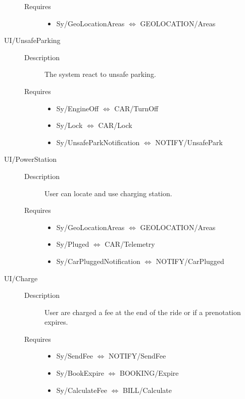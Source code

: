 \documentclass[11pt]{article} %
\begin{document}
\begin{description}
\begin{description}
		\item[Requires] \hfill
		\begin{itemize}
			\item Sy/GeoLocationAreas $\Leftrightarrow$ GEOLOCATION/Areas
		\end{itemize}
	\end{description}
	\item[UI/UnsafeParking] \hfill
	\begin{description}
		\item[Description] The system react to unsafe parking.
		\item[Requires] \hfill
		\begin{itemize}
			\item Sy/EngineOff $\Leftrightarrow$ CAR/TurnOff
			\item Sy/Lock $\Leftrightarrow$ CAR/Lock
			\item Sy/UnsafeParkNotification $\Leftrightarrow$  NOTIFY/UnsafePark
		\end{itemize}
	\end{description}
	\item[UI/PowerStation] \hfill
	\begin{description}
		\item[Description] User can locate and use charging station.
		\item[Requires] \hfill
		\begin{itemize}
			\item Sy/GeoLocationAreas $\Leftrightarrow$ GEOLOCATION/Areas
			\item Sy/Pluged $\Leftrightarrow$ CAR/Telemetry
			\item Sy/CarPluggedNotification $\Leftrightarrow$ NOTIFY/CarPlugged
		\end{itemize}
	\end{description}
	\item[UI/Charge] \hfill
	\begin{description}
		\item[Description] User are charged a fee at the end of the ride or if a prenotation expires.
		\item[Requires] \hfill
		\begin{itemize}
			\item Sy/SendFee $\Leftrightarrow$ NOTIFY/SendFee
			\item Sy/BookExpire $\Leftrightarrow$ BOOKING/Expire
			\item Sy/CalculateFee $\Leftrightarrow$ BILL/Calculate
		\end{itemize}

\end{description}
\end{description}
\end{document}
